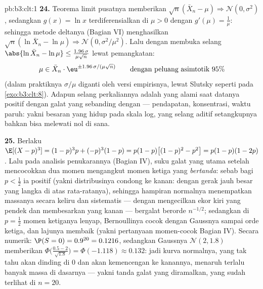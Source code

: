 \begin{solution}{pb:b3:clt:1}
\textbf{24.} Teorema limit pusatnya memberikan $\sqrt n(\bar X_n - \mu)
\Rightarrow \mathcal N(0, \sigma^2)$, sedangkan $g(x) = \ln x$
terdiferensialkan di $\mu > 0$ dengan $g'(\mu) = \frac1\mu$: sehingga
metode deltanya (Bagian VI) menghasilkan $\sqrt n(\ln\bar X_n - \ln\mu)
\Rightarrow \mathcal N(0, \sigma^2/\mu^2)$. Lalu dengan membuka
selang $\abs{\ln\bar X_n - \ln\mu} \leq
\frac{1.96\,\sigma}{\mu\sqrt n}$ lewat pemangkatan:
\[
\mu \in \bar X_n\cdot
\eu^{\pm1.96\,\sigma/(\mu\sqrt n)}
\qquad\text{dengan peluang asimtotik } 95\%
\]
(dalam praktiknya $\sigma/\mu$ diganti oleh versi
empirisnya, lewat Slutsky seperti pada \cref{exo:b3:clt:8}). Adapun
selang perkaliannya adalah yang alami saat datanya
positif dengan galat yang sebanding dengan  ---
pendapatan, konsentrasi, waktu paruh: yakni besaran yang hidup
pada skala log, yang selang aditif setangkupnya bahkan bisa
melewati nol di sana.

\textbf{25.} Berlaku $\E[(X - p)^3] = (1-p)^3p + (-p)^3(1 - p) =
p(1-p)\bigl[(1-p)^2 - p^2\bigr] = p(1-p)(1 - 2p)$. Lalu pada
analisis penukarannya (Bagian IV), suku galat yang utama setelah
mencocokkan dua momen mengangkut momen ketiga yang \emph{bertanda}:
sebab bagi $p < \frac12$ ia positif (yakni distribusinya condong
ke kanan: dengan gerak jauh besar yang langka di atas rata-ratanya), sehingga
hampiran normalnya menempatkan massanya secara keliru dan sistematis ---
dengan mengecilkan ekor kiri yang pendek dan membesarkan
yang kanan --- bergalat berorde $n^{-1/2}$; sedangkan di $p =
\frac12$ momen ketiganya lenyap, Bernoullinya cocok
dengan Gaussnya sampai orde ketiga, dan lajunya membaik (yakni pertanyaan
momen-cocok Bagian IV). Secara numerik: $\P(S = 0) =
0.9^{20} = 0.1216$, sedangkan Gaussnya
$\mathcal N(2, 1.8)$ memberikan $\Phi\bigl(\frac{0.5 -
2}{\sqrt{1.8}}\bigr) = \Phi(-1.118) \approx 0.132$: jadi
kurva normalnya, yang tak tahu akan dinding di $0$ dan akan
kemencengan ke kanannya, menaruh terlalu banyak massa di dasarnya --- yakni
tanda galat yang diramalkan, yang sudah terlihat di $n = 20$.

\end{solution}

